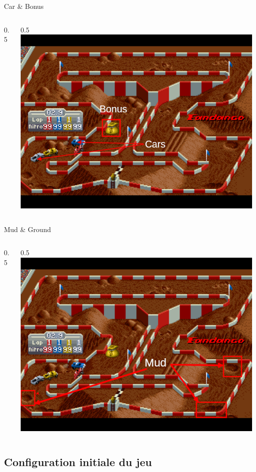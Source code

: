 \documentclass[10pt,dvipsnames,final]{beamer}
\newcommand{\midcolumn}[2]{
\begin{columns}
	\begin{column}{0.5\textwidth}
		#1
	\end{column}
	\begin{column}{0.5\textwidth}
		#2
	\end{column}
\end{columns}
}
\begin{document}
\begin{frame}{Car \& Bonus}
\midcolumn{}{\includegraphics[width=\textwidth]{presentationfiles/cars-bonus-sor}}
\end{frame}

\begin{frame}{Mud \& Ground}
\midcolumn{}{\includegraphics[width=\textwidth]{presentationfiles/Mud}}
\end{frame}

\subsection{Configuration initiale du jeu}
\end{document}

